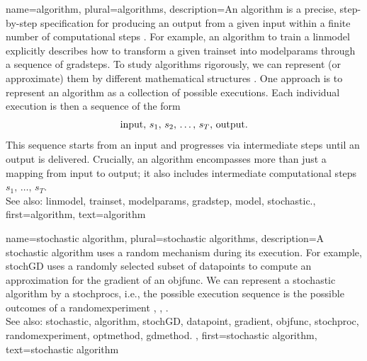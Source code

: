 {name={algorithm}, plural={algorithms},
 	description={An algorithm is a precise, step-by-step specification for 
  		producing an output from a given input within a finite number of computational steps \cite{Cormen:2022aa}. 
    		For example, an algorithm to train a \gls{linmodel} explicitly describes how to 
		transform a given \gls{trainset} into \gls{modelparams} through a sequence of \glspl{gradstep}. 
    		To study algorithms rigorously, we can represent (or approximate) them by different mathematical structures \cite{Sipser2013}. 
     		One approach is to represent an algorithm as a collection of possible executions. Each individual 
     		execution is then a sequence of the form $${\rm input}, \,s_1, \,s_2, \,\ldots, \,s_T, \,{\rm output}.$$ This sequence 
     		starts from an input and progresses via intermediate steps until an output is delivered. Crucially, an algorithm 
     		encompasses more than just a mapping from input to output; it also includes intermediate computational 
     		steps $s_1, \,\ldots, \,s_T$.
				\\ 
		See also: \gls{linmodel}, \gls{trainset}, \gls{modelparams}, \gls{gradstep}, \gls{model}, \gls{stochastic}.},
	first={algorithm},
	text={algorithm} 
}

{name={stochastic algorithm}, 
 plural={stochastic algorithms},
	description={A \gls{stochastic} \gls{algorithm} uses a random mechanism 
		during its execution. For example, \gls{stochGD} uses a randomly selected subset of \glspl{datapoint} 
		to compute an approximation for the \gls{gradient} of an \gls{objfunc}. We can represent a 
		\gls{stochastic} \gls{algorithm} by a \glspl{stochproc}, i.e., the possible execution sequence is the possible outcomes of 
		a \gls{randomexperiment} \cite{BertsekasProb}, \cite{RandomizedAlgos}, \cite{Gallager13}.		
		\\ 
		See also: \gls{stochastic}, \gls{algorithm}, \gls{stochGD}, \gls{datapoint}, \gls{gradient}, \gls{objfunc}, \gls{stochproc}, 
		\gls{randomexperiment}, \gls{optmethod}, \gls{gdmethod}. },
	first={stochastic algorithm},
	text={stochastic algorithm} 
}

